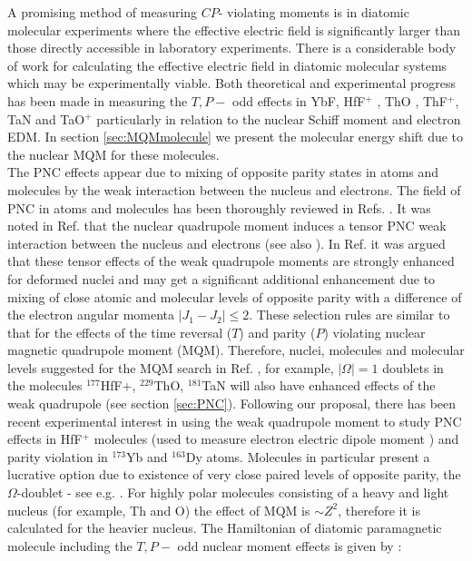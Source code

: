 \documentclass[10pt,a4paper, twoside, openright]{report}
\begin{document}
\linebreak
 A promising method of measuring $CP$- violating moments is in diatomic molecular experiments where the effective electric field is significantly larger than those directly accessible in laboratory experiments.  There is a considerable body of work for calculating the effective electric field in diatomic molecular systems which may be experimentally viable. Both theoretical and experimental progress has been made in measuring the $T,P-$ odd effects in  YbF\cite{Hudson2011, Mosyagin1998, Quiney1998, Parpia1998, Kozlov1994, Nayak2009, Steimle2007, Abe2014}, HfF$^+$ \cite{Cossel2012, Loh2013, Petrov2007, Fleig2013, Meyer2006, Skripnikov2008Hf, Le2013, Skripnikov2017Hf, Cairncross2017}, ThO \cite{Petrov2014, Meyer2008, Skripnikov2013ThO, Skripnikov2014ThO, Titov2015ThO, Fleig2014, Denis2016, Baron2017}, ThF$^+$\cite{Loh2013, Skripnikov2015Th, Denis2015}, TaN \cite{Skripnikov2015Ta, Fleig2016TaN} and TaO$^+$ \cite{Fleig2018} particularly in relation to the nuclear Schiff moment and electron EDM.   In section \ref{sec:MQMmolecule} we present the molecular energy shift due to the nuclear MQM for these molecules.\\
 \linebreak 
 The PNC effects appear due to mixing of opposite parity states in atoms and molecules by the weak interaction between the nucleus and electrons. The field  of PNC in atoms and molecules has been thoroughly reviewed in Refs.  \cite{KhriplovichPNC,GingesReview,RobertsReview}. It was noted in Ref.  \cite{FS78} that the nuclear quadrupole moment induces a tensor PNC weak interaction between the nucleus and electrons (see also  \cite{KhriplovichPNC,KP91}). In Ref. \cite{Flambaum2016} it was argued that these tensor  effects of the weak quadrupole moments are strongly enhanced for deformed nuclei and may get a significant additional enhancement due to mixing of  close atomic and molecular levels of opposite parity with a  difference of the electron angular momenta $|J_1-J_2| \le 2$. These selection rules are similar to that for the effects of the time reversal ($T$) and parity ($P$) violating nuclear magnetic quadrupole moment (MQM). Therefore, nuclei, molecules and molecular levels  suggested for the MQM search in Ref. \cite{Flambaum2014},  for example,  $|\Omega |=1$ doublets in the molecules $^{177}$HfF+, $^{229}$ThO, $^{181}$TaN will also have enhanced effects of the weak quadrupole (see section \ref{sec:PNC}). Following our proposal, there has been recent experimental interest in using the weak quadrupole moment to study PNC effects in HfF$^{+}$ molecules (used to measure electron electric dipole moment \cite{Cairncross2017}) and parity violation in $^{173}$Yb \cite{Antypas2017} and $^{163}$Dy \cite{Leefer2017} atoms. Molecules in particular present a lucrative option due to existence of very close paired levels of opposite parity, the  $\Omega$-doublet - see e.g.  \cite{Flambaum2014}. For highly polar molecules consisting of a heavy and light nucleus (for example, Th and O) the effect of MQM is $\sim Z^2$, therefore it is calculated for the heavier nucleus. The Hamiltonian of diatomic paramagnetic molecule including the $T, P-$ odd nuclear moment effects is given by \cite{SFK1984,Kozlov1995}:
\end{document}
